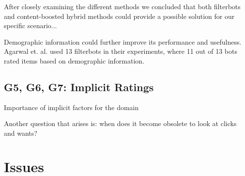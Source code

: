 After closely examining the different methods we concluded that both filterbots and content-boosted hybrid methods could provide a possible solution for
our specific scenario...

Demographic information could further improve its performance and usefulness. Agarwal et. al. \cite{Agarwal2009} used 13 filterbots in their experiments, where 11 out of 13 bots rated items based on demographic information.


\subsection{G5, G6, G7: Implicit Ratings}
\label{sec:implicit-discussion}

Importance of implicit factors for the domain

Another question that arises is: when does it become obsolete to look at clicks and wants?






\section{Issues}\label{sec:issues}

